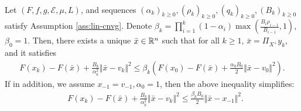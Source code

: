 \documentclass[12pt]{article}
\begin{document}
        \begin{theorem}\;\label{thm:cnvg-generic-seq}\\
            Let $(F, f, g, \mathcal E, \mu, L)$, and sequences $(\alpha_k)_{k \ge 0}, (\rho_k)_{k \ge 0}, (q_k)_{k \ge 0}, (B_k)_{k \ge 0}$ 
            satisfy Assumption \ref{ass:lin-cnvg}. 
            Denote $\beta_k = \prod_{i = 1}^k(1 - \alpha_i) \max \left(\frac{B_i\rho_{i - 1}}{B_{i - 1}}, 1\right)$, $\beta_0 = 1$. 
            Then, there exists a unique $\bar x \in \mathbb R^n$ such that for all $k \ge 1$, $\bar x = \Pi_{X^+}y_k$, and it satisfies
            \begin{align*}
                F(x_k) - F(\bar x) + \frac{B_k}{\alpha_k^2}\Vert \bar x - v_k\Vert^2 
                \le 
                \beta_k\left(
                    F(x_0) - F(\bar x) + \frac{\alpha_0B_0}{2}\Vert \bar x - v_0\Vert^2
                \right). 
            \end{align*}
            If in addition, we assume $x_{-1} = v_{-1}, \alpha_0 = 1$, then the above inequality simplifies: 
            \begin{align*}
                & F(x_k) - F(\bar x) + \frac{B_k}{\alpha_k^2}\Vert \bar x - v_k\Vert^2 \le 
                \frac{\beta_kB_0}{2}\Vert \bar x - x_{-1}\Vert^2.
            \end{align*}
        \end{theorem}
\end{document}
